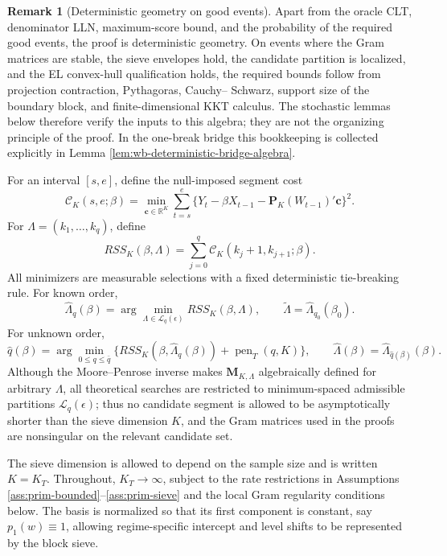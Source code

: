 \documentclass[12pt]{article}
\numberwithin{equation}{section}
\theoremstyle{definition}
\newtheorem{remark}{Remark}
\newcommand{\R}{\mathbb R}
\begin{document}
\begin{remark}[Deterministic geometry on good events]
\label{rem:deterministic-good-event-geometry}
Apart from the oracle CLT, denominator LLN, maximum-score bound, and the
probability of the required good events, the proof is deterministic geometry.
On events where the Gram matrices are stable, the sieve envelopes hold, the
candidate partition is localized, and the EL convex-hull qualification holds,
the required bounds follow from projection contraction, Pythagoras, Cauchy--
Schwarz, support size of the boundary block, and finite-dimensional KKT
calculus. The stochastic lemmas below therefore verify the inputs to this
algebra; they are not the organizing principle of the proof. In the one-break
bridge this bookkeeping is collected explicitly in Lemma
\ref{lem:wb-deterministic-bridge-algebra}.
\end{remark}
For an interval \([s,e]\), define the null-imposed segment cost
\[
    \mathcal C_K(s,e;\beta)
    =
    \min_{\bm c\in\R^K}
    \sum_{t=s}^e
    \{Y_t-\beta X_{t-1}-\bm P_K(W_{t-1})'\bm c\}^2.
\]
For \(\Lambda=(k_1,\ldots,k_q)\), define
\[
    RSS_K(\beta,\Lambda)
    =
    \sum_{j=0}^q
    \mathcal C_K(k_j+1,k_{j+1};\beta).
\]
All minimizers are measurable selections with a fixed deterministic tie-breaking rule. For known order,
\[
    \widehat\Lambda_q(\beta)
    =
    \arg\min_{\Lambda\in\mathcal L_q(\epsilon)}
    RSS_K(\beta,\Lambda),
    \qquad
    \widetilde\Lambda=\widehat\Lambda_{q_0}(\beta_0).
\]
For unknown order,
\[
    \widehat q(\beta)
    =
    \arg\min_{0\leq q\leq \bar q}
    \{RSS_K(\beta,\widehat\Lambda_q(\beta))+\operatorname{pen}_T(q,K)\},
    \qquad
    \widehat\Lambda(\beta)=\widehat\Lambda_{\widehat q(\beta)}(\beta).
\]
Although the Moore--Penrose inverse makes \(\bm M_{K,\Lambda}\) algebraically defined for arbitrary \(\Lambda\), all theoretical searches are restricted to minimum-spaced admissible partitions \(\mathcal L_q(\epsilon)\); thus no candidate segment is allowed to be asymptotically shorter than the sieve dimension \(K\), and the Gram matrices used in the proofs are nonsingular on the relevant candidate set.

The sieve dimension is allowed to depend on the sample size and is written \(K=K_T\). Throughout, \(K_T\to\infty\), subject to the rate restrictions in Assumptions \ref{ass:prim-bounded}--\ref{ass:prim-sieve} and the local Gram regularity conditions below. The basis is normalized so that its first component is constant, say \(p_1(w)\equiv1\), allowing regime-specific intercept and level shifts to be represented by the block sieve.
\end{document}
